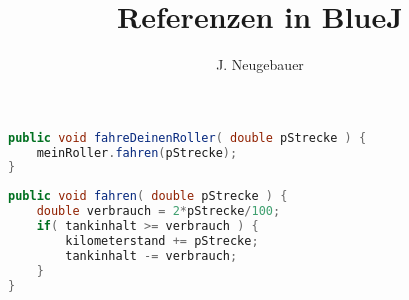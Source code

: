 \documentclass[a4paper,10pt]{scrartcl}
\author{J. Neugebauer}
\title{Referenzen in BlueJ}
\date{\Heute}
\begin{document}
\ReiheTitel

\zeilennummernAus
\noindent\begin{minipage}{.45\textwidth}
\begin{lstlisting}[language=Java]
public void fahreDeinenRoller( double pStrecke ) {
	meinRoller.fahren(pStrecke);
}
\end{lstlisting}
\end{minipage}\hfill
\begin{minipage}{.45\textwidth}
\begin{lstlisting}[language=Java]
public void fahren( double pStrecke ) {
	double verbrauch = 2*pStrecke/100;
	if( tankinhalt >= verbrauch ) {
		kilometerstand += pStrecke;
		tankinhalt -= verbrauch;
	}
}
\end{lstlisting}
\end{minipage}
\end{document}
